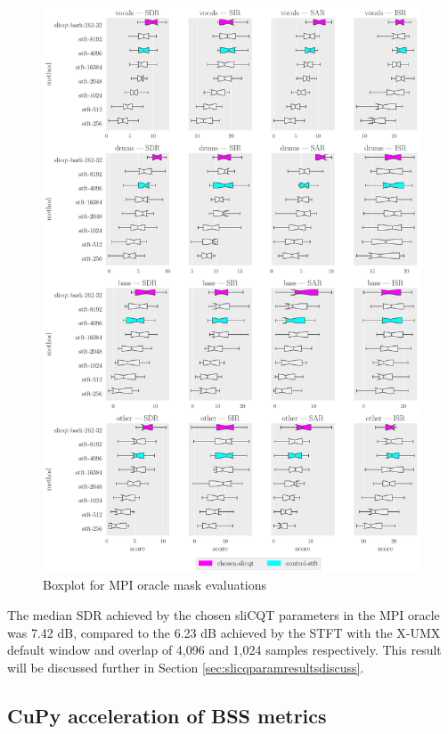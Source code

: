 \documentclass[report.tex]{subfiles}
\begin{document}
\begin{figure}[ht]
	\centering
	\includegraphics[width=\textwidth]{./images-bss/oracle_boxplot.pdf}
	\caption{Boxplot for MPI oracle mask evaluations}
	\label{fig:oraclebssboxplot}
\end{figure}

The median SDR achieved by the chosen sliCQT parameters in the MPI oracle was 7.42 dB, compared to the 6.23 dB achieved by the STFT with the X-UMX default window and overlap of 4,096 and 1,024 samples respectively. This result will be discussed further in Section \ref{sec:slicqparamresultsdiscuss}.

\subsection{CuPy acceleration of BSS metrics}
\label{sec:cupyportbss}
\end{document}
